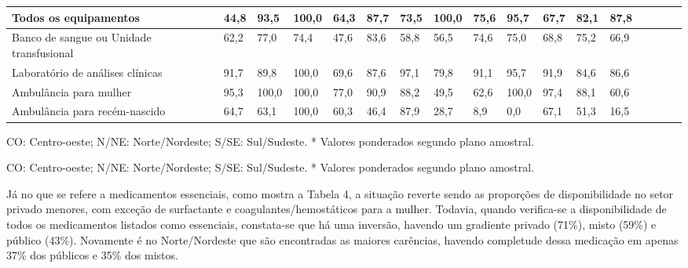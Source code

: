 \documentclass{article}
\begin{document}
\begin{table}
\begin{xtabular}{ l | l | l | l | l l | l | l | l | l | l | l | l | l | l | l |
l }
Todos os equipamentos
& 44,8
& 93,5
& 100,0
& 64,3
& 87,7
& 73,5
& 100,0
& 75,6
& 95,7
& 67,7
& 82,1
& 87,8
\\ \hline

Banco de sangue ou Unidade transfusional
& 62,2
& 77,0
& 74,4
& 47,6
& 83,6
& 58,8
& 56,5
& 74,6
& 75,0
& 68,8
& 75,2
& 66,9
\\ \hline

Laboratório de análises clínicas
& 91,7
& 89,8
& 100,0
& 69,6
& 87,6
& 97,1
& 79,8
& 91,1
& 95,7
& 91,9
& 84,6
& 86,6
\\ \hline

Ambulância para mulher
& 95,3
& 100,0
& 100,0
& 77,0
& 90,9
& 88,2
& 49,5
& 62,6
& 100,0
& 97,4
& 88,1
& 60,6
\\ \hline

Ambulância para recém-nascido
& 64,7
& 63,1
& 100,0
& 60,3
& 46,4
& 87,9
& 28,7
& 8,9
& 0,0
& 67,1
& 51,3
& 16,5
\\ \hline

\end{xtabular}
\end{table}

CO: Centro-oeste; N/NE: Norte/Nordeste; S/SE: Sul/Sudeste. * Valores
ponderados segundo plano amostral.

CO: Centro-oeste; N/NE: Norte/Nordeste; S/SE: Sul/Sudeste. * Valores
ponderados segundo plano amostral.

Já no que se refere a medicamentos essenciais, como mostra a Tabela 4, a
situação reverte sendo as proporções de
disponibilidade no setor privado menores, com exceção de surfactante e
coagulantes/hemostáticos para a mulher. Todavia, quando verifica-se a
disponibilidade de todos os medicamentos listados como essenciais, constata-se
que
há uma inversão, havendo um gradiente privado (71\%), misto (59\%) e público
(43\%).
Novamente é no Norte/Nordeste que são encontradas as maiores carências, havendo
completude dessa medicação em apenas 37\% dos públicos e 35\% dos mistos.
\end{document}
